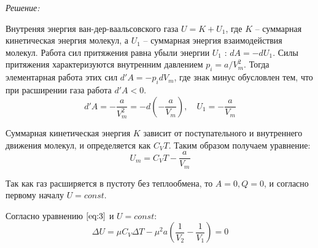 \documentclass[14pt,final,titlepage,pscyr]{hedsemwork}
\begin{document}
\emph{Решение:}

Внутреняя энергия ван-дер-ваальсовского газа \( U = K + U_1 \), где 
\( K \) -- суммарная кинетическая энергия молекул, а \( U_1 \) -- суммарная 
энергия взаимодействия молекул. Работа сил притяжения равна убыли энергии 
\( U_1 \) : \( dA = -dU_1 \). Силы притяжения характеризуются внутренним 
давлением \( p_i = a / V^2_m \). Тогда элементарная работа этих сил
\( d'A = -p_i dV_m \), где знак минус обусловлен тем, что при расширении газа 
работа \( d'A < 0 \).
\[
	d'A = -\frac{a}{V^2_m} = -d\left( -\frac{a}{V_m} \right), \quad
	U_1 = -\frac{a}{V_m}
\] 

Суммарная кинетическая энергия \( K \) зависит от поступательного и 
внутреннего движения молекул, и определяется как \( C_V T \). Таким образом 
получаем уравнение:
\begin{equation}
	U_m = C_V T - \frac{a}{V_m}
	\label{eq:3}
\end{equation} 

Так как газ расширяется в пустоту без теплообмена, то \( A = 0, Q = 0 \), и 
согласно первому началу \( U = const \).

Согласно уравнению \( \ref{eq:3} \) и \( U = const \):
\[
	\Delta U = \mu C_V \Delta T - \mu^2 a 
		\left( \frac{1}{V_2} - \frac{1}{V_1} \right) = 0
\]
\end{document}
